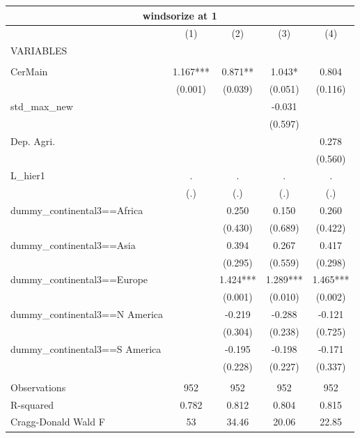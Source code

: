 \begin{tabular}{lcccc}
\multicolumn{5}{c}{windsorize at 1} \\ \hline
 & (1) & (2) & (3) & (4) \\
VARIABLES &  &  &  &  \\ \hline
 &  &  &  &  \\
CerMain & 1.167*** & 0.871** & 1.043* & 0.804 \\
 & (0.001) & (0.039) & (0.051) & (0.116) \\
std\_max\_new &  &  & -0.031 &  \\
 &  &  & (0.597) &  \\
Dep. Agri. &  &  &  & 0.278 \\
 &  &  &  & (0.560) \\
L\_hier1 & . & . & . & . \\
 & (.) & (.) & (.) & (.) \\
dummy\_continental3==Africa &  & 0.250 & 0.150 & 0.260 \\
 &  & (0.430) & (0.689) & (0.422) \\
dummy\_continental3==Asia &  & 0.394 & 0.267 & 0.417 \\
 &  & (0.295) & (0.559) & (0.298) \\
dummy\_continental3==Europe &  & 1.424*** & 1.289*** & 1.465*** \\
 &  & (0.001) & (0.010) & (0.002) \\
dummy\_continental3==N America &  & -0.219 & -0.288 & -0.121 \\
 &  & (0.304) & (0.238) & (0.725) \\
dummy\_continental3==S America &  & -0.195 & -0.198 & -0.171 \\
 &  & (0.228) & (0.227) & (0.337) \\
 &  &  &  &  \\
Observations & 952 & 952 & 952 & 952 \\
R-squared & 0.782 & 0.812 & 0.804 & 0.815 \\
 Cragg-Donald Wald F & 53 & 34.46 & 20.06 & 22.85 \\ \hline
\end{tabular}
